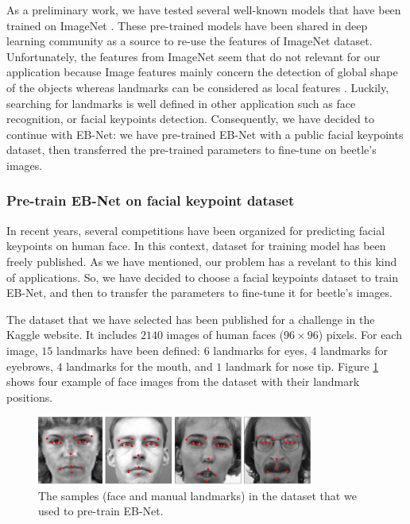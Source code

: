 \documentclass[review]{elsarticle}
\begin{document}
As a preliminary work, we have tested several well-known models \cite{krizhevsky2012imagenet, simonyan2014very} that have been trained on ImageNet \cite{deng2009imagenet}. These pre-trained models have been shared in deep learning community as a source to re-use the features of ImageNet dataset. Unfortunately, the features from ImageNet seem that do not relevant for our application because Image features mainly concern the detection of global shape of the objects whereas landmarks can be considered as local features \cite{lin2016homemade}. Luckily, searching for landmarks is well defined in other application such as face recognition, or facial keypoints detection. Consequently, we have decided to continue with EB-Net: we have pre-trained EB-Net with a public facial keypoints dataset, then transferred the pre-trained parameters to fine-tune on beetle's images.

\subsubsection{Pre-train EB-Net on facial keypoint dataset}
In recent years, several competitions \cite{} have been organized for predicting facial keypoints on human face. In this context, dataset for training model has been freely published. As we have mentioned, our problem has a revelant to this kind of applications. So, we have decided to choose a facial keypoints dataset to train EB-Net, and then to transfer the parameters to fine-tune it for beetle's images.

The dataset that we have selected has been published for a challenge \cite{} in the Kaggle website. It includes $2140$ images of human faces ($96 \times 96$) pixels. For each image, $15$ landmarks have been defined: $6$ landmarks for eyes, $4$ landmarks for eyebrows, $4$ landmarks for the mouth, and $1$ landmark for nose tip. Figure \ref{fighmface} shows four example of face images from the dataset with their landmark positions.

\begin{figure}[h!]
	\centering
	\includegraphics[width=0.81\textwidth]{images/face_dataset_2}
	\caption{The samples (face and manual landmarks) in the dataset that we used to pre-train EB-Net.}
	\label{fighmface}
\end{figure}
\end{document}
